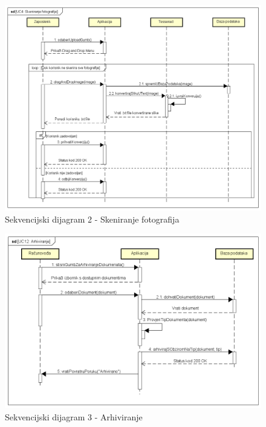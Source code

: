 				\begin{figure}[H]
					\includegraphics[scale=0.5]{slike/uc4_skeniranje_fotografije.PNG} %
					\centering
					\caption{Sekvencijski dijagram 2 - Skeniranje fotografija}
					\label{fig:promjene}
				\end{figure}

				\begin{figure}[H]
					\includegraphics[scale=0.5]{slike/uc12_arhiviranje.PNG} %
					\centering
					\caption{Sekvencijski dijagram 3 - Arhiviranje}
					\label{fig:promjene}
				\end{figure}

